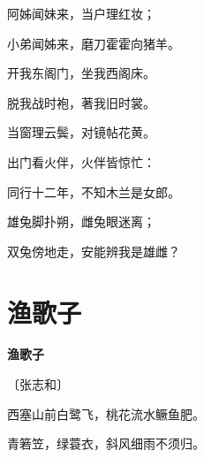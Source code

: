 \documentclass[12pt,UTF-8,openany,fontset=none]{ctexbook}
\begin{document}
\begin{center}
\begin{Large}
        阿姊闻妹来，当户理红妆；

        \hspace{36pt}小弟闻姊来，磨刀霍霍向猪羊。

        开我东阁门，坐我西阁床。

        脱我战时袍，著我旧时裳。

        当窗理云鬓，对镜帖花黄。

        出门看火伴，火伴皆惊忙：

        \hspace{36pt}同行十二年，不知木兰是女郎。

        雄兔脚扑朔，雌兔眼迷离；

        \hspace{36pt}双兔傍地走，安能辨我是雄雌？

    \end{Large}

\end{center}

\vspace{8pt}
\clearpage

\section{渔歌子}


\begin{center}
    {\bfseries 渔歌子}

    \vspace{18pt}

    \begin{large}\xuwen
        〔张志和〕
    \end{large}

\end{center}

    \vspace{18pt}  %

\begin{center}
    \begin{Large}

        西塞山前白鹭飞，桃花流水鳜鱼肥。

        青箬笠，绿蓑衣，斜风细雨不须归。

    \end{Large}

\end{center}

\vspace{8pt}
\clearpage
\end{document}
